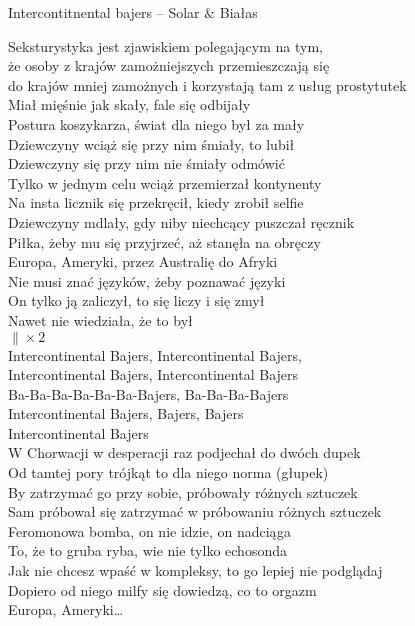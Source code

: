 \begin{piosenka}{Intercontitnental bajers -- Solar $\&$ Białas}

Seksturystyka jest zjawiskiem polegającym na tym, \\ 
że osoby z krajów zamożniejszych przemieszczają się \\
do krajów mniej zamożnych i korzystają tam z usług prostytutek \\[\zwrotkaspace]

Miał mięśnie jak skały, fale się odbijały \\
Postura koszykarza, świat dla niego był za mały \\
Dziewczyny wciąż się przy nim śmiały, to lubił \\
Dziewczyny się przy nim nie śmiały odmówić \\[\zwrotkaspace]

Tylko w jednym celu wciąż przemierzał kontynenty \\
Na insta licznik się przekręcił, kiedy zrobił selfie \\
Dziewczyny mdlały, gdy niby niechcący puszczał ręcznik \\
Piłka, żeby mu się przyjrzeć, aż stanęła na obręczy \\[\zwrotkaspace]

 Europa, Ameryki, przez Australię do Afryki \\
 Nie musi znać języków, żeby poznawać języki \\
 On tylko ją zaliczył, to się liczy i się zmył \\
 Nawet nie wiedziała, że to był \\
 $\| \times 2$ \\[\zwrotkaspace]

 Intercontinental Bajers, Intercontinental Bajers, \\
 Intercontinental Bajers, Intercontinental Bajers \\
 Ba-Ba-Ba-Ba-Ba-Ba-Bajers, Ba-Ba-Ba-Bajers \\[\zwrotkaspace]

Intercontinental Bajers, Bajers, Bajers \\
Intercontinental Bajers \\[\zwrotkaspace]

W Chorwacji w desperacji raz podjechał do dwóch dupek \\
Od tamtej pory trójkąt to dla niego norma (głupek) \\
By zatrzymać go przy sobie, próbowały różnych sztuczek \\
Sam próbował się zatrzymać w próbowaniu różnych sztuczek \\[\zwrotkaspace]

Feromonowa bomba, on nie idzie, on nadciąga \\
To, że to gruba ryba, wie nie tylko echosonda \\
Jak nie chcesz wpaść w kompleksy, to go lepiej nie podglądaj \\
Dopiero od niego milfy się dowiedzą, co to orgazm \\[\zwrotkaspace]

 Europa, Ameryki\ldots \\[\zwrotkaspace]


\end{piosenka}
